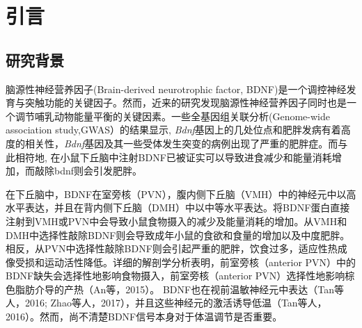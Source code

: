 \chapter{引言}\label{chap:introduction}

\section{研究背景}
脑源性神经营养因子(Brain-derived neurotrophic factor, BDNF)是一个调控神经发育与突触功能的关键因子。然而，近来的研究发现脑源性神经营养因子同时也是一个调节哺乳动物能量平衡的关键因素\cite{xu2016neurotrophic}。一些全基因组关联分析(Genome-wide association study,GWAS）的结果显示, \textit{Bdnf}基因上的几处位点和肥胖发病有着高度的相关性\cite{thorleifsson2009genome,speliotes2010association,wen2012meta}，\textit{Bdnf}基因及其一些受体发生突变的病例出现了严重的肥胖症\cite{gray2006hyperphagia}。而与此相符地, 在小鼠下丘脑中注射BDNF已被证实可以导致进食减少和能量消耗增加\citep{wang2010brain}，而敲除bdnf则会引发肥胖\citep{xu2003brain, unger2007selective, liao2012dendritically}。

在下丘脑中，BDNF在室旁核（PVN），腹内侧下丘脑（VMH）中的神经元中以高水平表达，并且在背内侧下丘脑（DMH）中以中等水平表达\citep{xu2003brain, unger2007selective, liao2012dendritically, an2015discrete}。将BDNF蛋白直接注射到VMH或PVN中会导致小鼠食物摄入的减少及能量消耗的增加\citep{ godar2011reduction}。从VMH和DMH中选择性敲除BDNF则会导致成年小鼠的食欲和食量的增加以及中度肥胖\citep{unger2007selective}。相反，从PVN中选择性敲除BDNF则会引起严重的肥胖，饮食过多，适应性热成像受损和运动活性降低\citep{an2015discrete}。详细的解剖学分析表明，前室旁核（anterior PVN）中的BDNF缺失会选择性地影响食物摄入，前室旁核（anterior PVN）选择性地影响棕色脂肪介导的产热（An等，2015）。 BDNF也在视前温敏神经元中表达（Tan等人，2016; Zhao等人，2017），并且这些神经元的激活诱导低温（Tan等人，2016）。然而，尚不清楚BDNF信号本身对于体温调节是否重要。